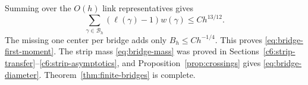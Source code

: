 Summing over the $O(h)$ link representatives gives
\[
 \sum_{\gamma\in\mathcal B_h}(\ell(\gamma)-1)w(\gamma)
 \le Ch^{13/12}.
\]
The missing one center per bridge adds only $B_h\le Ch^{-1/4}$. This proves \eqref{eq:bridge-first-moment}. The strip mass \eqref{eq:bridge-mass} was proved in Sections~\ref{c6:strip-transfer}--\ref{c6:strip-asymptotics}, and Proposition~\ref{prop:crossings} gives \eqref{eq:bridge-diameter}. Theorem~\ref{thm:finite-bridges} is complete.
